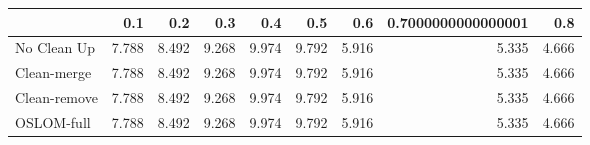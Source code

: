 \begin{tabular}{lrrrrrrrr}
\toprule
{} &   0.1 &   0.2 &   0.3 &   0.4 &   0.5 &   0.6 & 0.7000000000000001 &   0.8 \\
\midrule
No Clean Up  & 7.788 & 8.492 & 9.268 & 9.974 & 9.792 & 5.916 &              5.335 & 4.666 \\
Clean-merge  & 7.788 & 8.492 & 9.268 & 9.974 & 9.792 & 5.916 &              5.335 & 4.666 \\
Clean-remove & 7.788 & 8.492 & 9.268 & 9.974 & 9.792 & 5.916 &              5.335 & 4.666 \\
OSLOM-full   & 7.788 & 8.492 & 9.268 & 9.974 & 9.792 & 5.916 &              5.335 & 4.666 \\
\bottomrule
\end{tabular}
